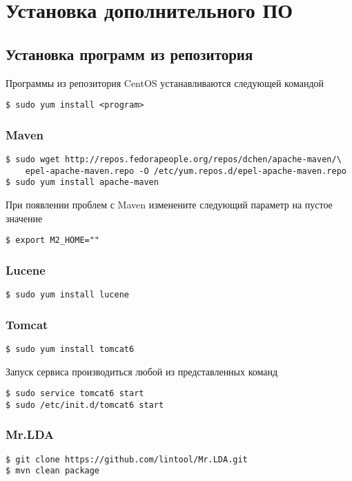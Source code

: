 \chapter{Установка дополнительного ПО}
\section{Установка программ из репозитория}
Программы из репозитория CentOS устанавливаются следующей командой
\begin{lstlisting}
$ sudo yum install <program>
\end{lstlisting}

\subsection{Maven}
\begin{lstlisting}
$ sudo wget http://repos.fedorapeople.org/repos/dchen/apache-maven/\
    epel-apache-maven.repo -O /etc/yum.repos.d/epel-apache-maven.repo
$ sudo yum install apache-maven
\end{lstlisting}
При появлении проблем с Maven изменените следующий параметр на пустое значение
\begin{lstlisting}
$ export M2_HOME=""
\end{lstlisting} 

\subsection{Lucene}
\begin{lstlisting}
$ sudo yum install lucene
\end{lstlisting}

\subsection{Tomcat}
\begin{lstlisting}
$ sudo yum install tomcat6
\end{lstlisting}
Запуск сервиса производиться любой из представленных команд
\begin{lstlisting}
$ sudo service tomcat6 start
$ sudo /etc/init.d/tomcat6 start
\end{lstlisting}

\subsection{Mr.LDA}
\begin{lstlisting}
$ git clone https://github.com/lintool/Mr.LDA.git
$ mvn clean package
\end{lstlisting}

